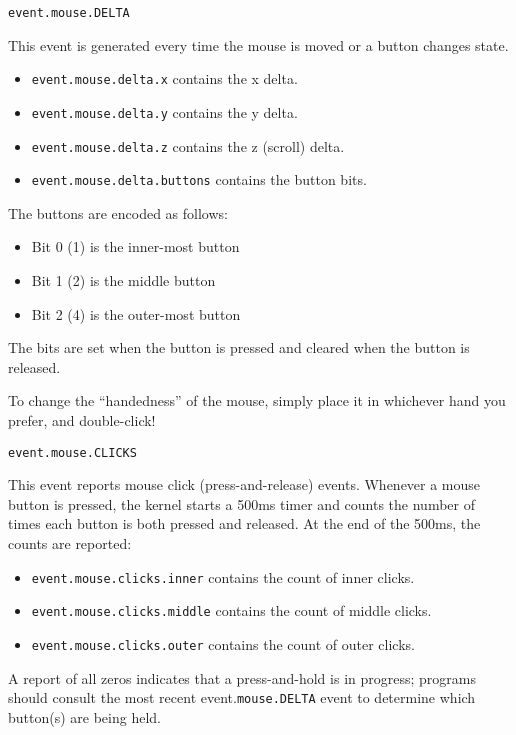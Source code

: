 \begin{verbatim}
event.mouse.DELTA
\end{verbatim}

This event is generated every time the mouse is moved or a button changes state.

\begin{itemize}
\item \verb+event.mouse.delta.x+ contains the x delta.
\item \verb+event.mouse.delta.y+ contains the y delta.
\item \verb+event.mouse.delta.z+ contains the z (scroll) delta.
\item \verb+event.mouse.delta.buttons+ contains the button bits.
\end{itemize}

The buttons are encoded as follows:

\begin{itemize}
\item Bit 0 (1) is the inner-most button
\item Bit 1 (2) is the middle button
\item Bit 2 (4) is the outer-most button
\end{itemize}

The bits are set when the button is pressed and cleared when the button is released.

To change the ``handedness'' of the mouse, simply place it in whichever hand you prefer, and double-click!  

\begin{verbatim}
event.mouse.CLICKS
\end{verbatim}

This event reports mouse click (press-and-release) events.  Whenever a mouse button is pressed, the kernel starts a 500ms timer and counts the number of times each button is both pressed and released.  At the end of the 500ms, the counts are reported:

\begin{itemize}
\item \verb+event.mouse.clicks.inner+ contains the count of inner clicks.
\item \verb+event.mouse.clicks.middle+ contains the count of middle clicks.
\item \verb+event.mouse.clicks.outer+ contains the count of outer clicks.
\end{itemize}

A report of all zeros indicates that a press-and-hold is in progress; programs should consult the most recent event.\verb+mouse.DELTA+ event to determine which button(s) are being held. 

